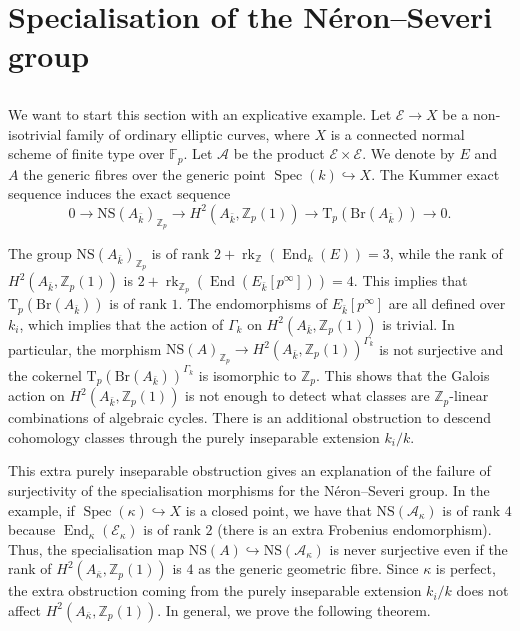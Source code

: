 \documentclass[11pt]{amsart}
\newcommand{\spa}{\medskip}
\newcommand{\Fp}{\mathbb{F}_p}
\newcommand{\Z}{\mathbb{Z}}
\newcommand{\kbar}{{\bar{k}}}
\newcommand{\Zp}{{\mathbb{Z}_{p}}}
\newcommand{\calA}{\mathcal{A}}
\newcommand{\calE}{\mathcal{E}}
\DeclareMathOperator{\Spec}{Spec}
\DeclareMathOperator{\End}{End}
\DeclareMathOperator{\rk}{rk}
\newcommand{\NS}{\mathrm{NS}}
\newcommand{\ki}{{k_i}}
\newcommand{\Tp}{\mathrm{T}_p}
\begin{document}
\section{Specialisation of the Néron--Severi group}
\label{spec:s}

\subsection{}
We want to start this section with an explicative example. Let $\calE\to X$ be a non-isotrivial family of ordinary elliptic curves, where $X$ is a connected normal scheme of finite type over $\Fp$. Let $\calA$ be the product $\calE\times \calE$. We denote by $E$ and $A$ the generic fibres over the generic point $\Spec(k)\hookrightarrow X$. The Kummer exact sequence induces the exact sequence 
	$$0\to\mathrm{NS}(A_{\bar{k}})_{\Z_p} \to H^2_{}(A_{\bar{k}},\Z_p(1))\to \Tp(\mathrm{Br}(A_{\bar{k}}))\to 0.$$

The group $\mathrm{NS}(A_{\bar{k}})_{\Z_p}$ is of rank $2+\rk_\Z(\End_k(E))=3$, while the rank of $H^2_{}(A_{\bar{k}},\Z_p(1))$ is $2+\rk_\Zp(\End(E_\kbar[p^\infty]))=4$. This implies that $\Tp(\mathrm{Br}(A_{\bar{k}}))$ is of rank $1$. The endomorphisms of $E_{\kbar}[p^\infty]$ are all defined over $\ki$, which implies that the action of $\Gamma_k$ on $H^2_{}(A_{\bar{k}},\Z_p(1))$ is trivial. In particular, the morphism $\mathrm{NS}(A)_{\Z_p} \to H^2_{}(A_{\bar{k}},\Z_p(1))^{\Gamma_k}$ is not surjective and the cokernel $\Tp(\mathrm{Br}(A_{\bar{k}}))^{\Gamma_k}$ is isomorphic to $\Zp$. This shows that the Galois action on $H^2_{}(A_{\bar{k}},\Z_p(1))$ is not enough to detect what classes are $\Zp$-linear combinations of algebraic cycles. There is an additional obstruction to descend cohomology classes through the purely inseparable extension $\ki/k$.

\spa

This extra purely inseparable obstruction gives an explanation of the failure of surjectivity of the specialisation morphisms for the Néron--Severi group. In the example, if $\Spec(\kappa)\hookrightarrow X$ is a closed point, we have that $\NS(\calA_{{\kappa}})$ is of rank $4$ because $\End_\kappa(\calE_\kappa)$ is of rank $2$ (there is an extra Frobenius endomorphism). Thus, the specialisation map $\NS(A)\hookrightarrow \NS(\calA_\kappa)$ is never surjective even if the rank of $H^2_{}(A_{\bar{\kappa}},\Z_p(1))$ is $4$ as the generic geometric fibre. Since $\kappa$ is perfect, the extra obstruction coming from the purely inseparable extension $\ki/k$ does not affect $H^2_{}(A_{\bar{\kappa}},\Z_p(1))$. In general, we prove the following theorem.
\end{document}
